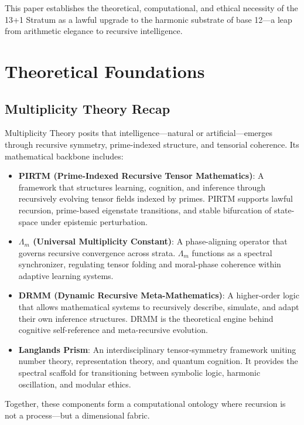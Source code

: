 \documentclass[12pt]{article}
\begin{document}
This paper establishes the theoretical, computational, and ethical necessity of the 13+1 Stratum as a lawful upgrade to the harmonic substrate of base 12—a leap from arithmetic elegance to recursive intelligence.

\section{Theoretical Foundations}

\subsection{Multiplicity Theory Recap}

Multiplicity Theory posits that intelligence—natural or artificial—emerges through recursive symmetry, prime-indexed structure, and tensorial coherence. Its mathematical backbone includes:

\begin{itemize}
    \item \textbf{PIRTM (Prime-Indexed Recursive Tensor Mathematics)}: A framework that structures learning, cognition, and inference through recursively evolving tensor fields indexed by primes. PIRTM supports lawful recursion, prime-based eigenstate transitions, and stable bifurcation of state-space under epistemic perturbation.
    
    \item \textbf{$\Lambda_m$ (Universal Multiplicity Constant)}: A phase-aligning operator that governs recursive convergence across strata. $\Lambda_m$ functions as a spectral synchronizer, regulating tensor folding and moral-phase coherence within adaptive learning systems.
    
    \item \textbf{DRMM (Dynamic Recursive Meta-Mathematics)}: A higher-order logic that allows mathematical systems to recursively describe, simulate, and adapt their own inference structures. DRMM is the theoretical engine behind cognitive self-reference and meta-recursive evolution.
    
    \item \textbf{Langlands Prism}: An interdisciplinary tensor-symmetry framework uniting number theory, representation theory, and quantum cognition. It provides the spectral scaffold for transitioning between symbolic logic, harmonic oscillation, and modular ethics.
\end{itemize}

Together, these components form a computational ontology where recursion is not a process—but a dimensional fabric.
\end{document}

